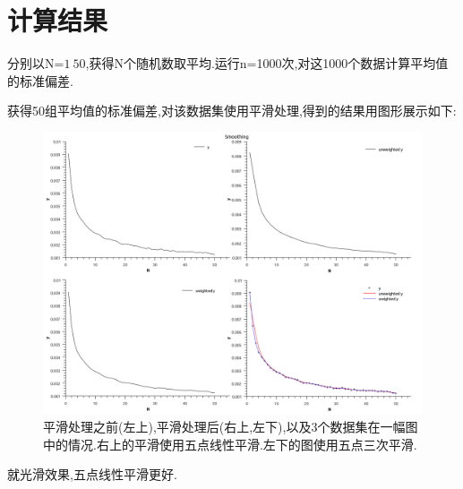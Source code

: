 \documentclass[10pt,a4paper]{article}
\begin{document}
\section{计算结果}
分别以N=$1~50$,获得N个随机数取平均.运行n=1000次,对这1000个数据计算平均值的标准偏差.

获得50组平均值的标准偏差,对该数据集使用平滑处理,得到的结果用图形展示如下:

\begin{figure}[H]
\centering
\includegraphics[width=\textwidth]{../result/Graph2.png}
\caption{平滑处理之前(左上),平滑处理后(右上,左下),以及3个数据集在一幅图中的情况.右上的平滑使用五点线性平滑.左下的图使用五点三次平滑.}
\end{figure}

就光滑效果,五点线性平滑更好.
\end{document}
